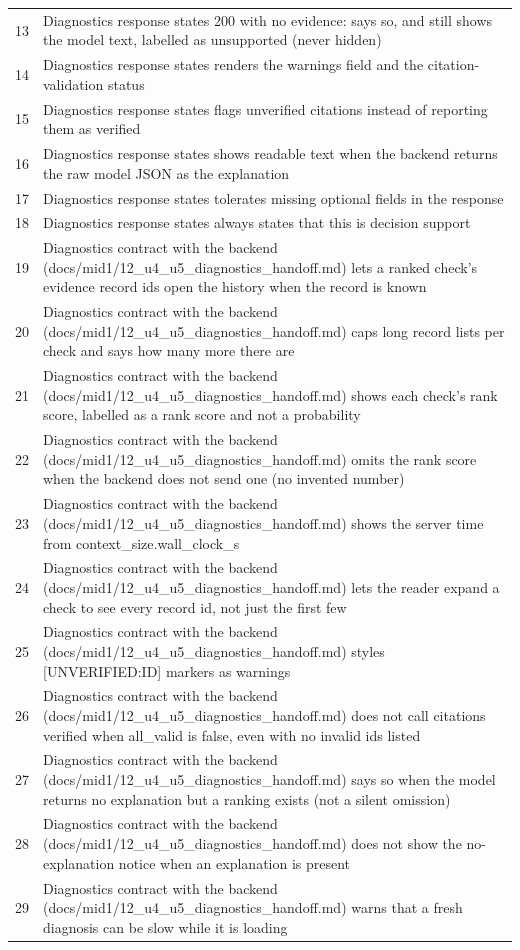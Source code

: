 \begin{longtable}{p{}p{}}
13 & Diagnostics response states 200 with no evidence: says so, and still shows the model text, labelled as unsupported (never hidden) \\
14 & Diagnostics response states renders the warnings field and the citation-validation status \\
15 & Diagnostics response states flags unverified citations instead of reporting them as verified \\
16 & Diagnostics response states shows readable text when the backend returns the raw model JSON as the explanation \\
17 & Diagnostics response states tolerates missing optional fields in the response \\
18 & Diagnostics response states always states that this is decision support \\
19 & Diagnostics contract with the backend (docs/mid1/12\_u4\_u5\_diagnostics\_handoff.md) lets a ranked check's evidence record ids open the history when the record is known \\
20 & Diagnostics contract with the backend (docs/mid1/12\_u4\_u5\_diagnostics\_handoff.md) caps long record lists per check and says how many more there are \\
21 & Diagnostics contract with the backend (docs/mid1/12\_u4\_u5\_diagnostics\_handoff.md) shows each check's rank score, labelled as a rank score and not a probability \\
22 & Diagnostics contract with the backend (docs/mid1/12\_u4\_u5\_diagnostics\_handoff.md) omits the rank score when the backend does not send one (no invented number) \\
23 & Diagnostics contract with the backend (docs/mid1/12\_u4\_u5\_diagnostics\_handoff.md) shows the server time from context\_size.wall\_clock\_s \\
24 & Diagnostics contract with the backend (docs/mid1/12\_u4\_u5\_diagnostics\_handoff.md) lets the reader expand a check to see every record id, not just the first few \\
25 & Diagnostics contract with the backend (docs/mid1/12\_u4\_u5\_diagnostics\_handoff.md) styles [UNVERIFIED:ID] markers as warnings \\
26 & Diagnostics contract with the backend (docs/mid1/12\_u4\_u5\_diagnostics\_handoff.md) does not call citations verified when all\_valid is false, even with no invalid ids listed \\
27 & Diagnostics contract with the backend (docs/mid1/12\_u4\_u5\_diagnostics\_handoff.md) says so when the model returns no explanation but a ranking exists (not a silent omission) \\
28 & Diagnostics contract with the backend (docs/mid1/12\_u4\_u5\_diagnostics\_handoff.md) does not show the no-explanation notice when an explanation is present \\
29 & Diagnostics contract with the backend (docs/mid1/12\_u4\_u5\_diagnostics\_handoff.md) warns that a fresh diagnosis can be slow while it is loading \\
\end{longtable}
